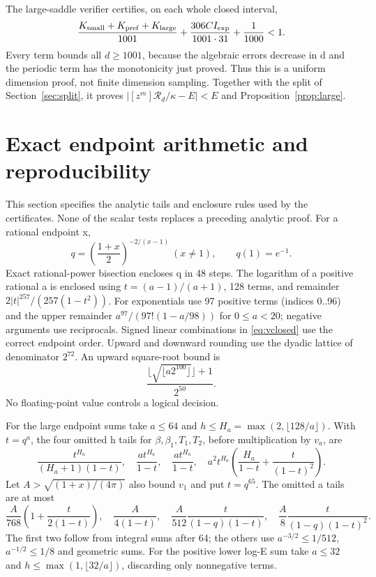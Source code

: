 \documentclass[11pt]{article}
\theoremstyle{remark}\newtheorem{remark}[theorem]{Remark}
\newcommand{\Rpoly}{\mathcal R}
\begin{document}
The large-saddle verifier certifies, on each whole closed interval,
\begin{equation}\label{eq:finalinterval}
 \frac{K_{\rm small}+K_{\rm pref}+K_{\rm large}}{1001}
       +\frac{306CI_{\exp}}{1001\cdot31}+\frac1{1000}<1.
\end{equation}
Every term bounds all $d\ge1001$, because the algebraic errors decrease in d
and the periodic term has the monotonicity just proved.
Thus this is a uniform dimension proof, not finite dimension sampling.
Together with the split of Section~\ref{sec:split}, it proves
$|[z^m]\Rpoly_d/\kappa-E|<E$ and Proposition~\ref{prop:large}.



\section{Exact endpoint arithmetic and reproducibility}\label{sec:exact}
This section specifies the analytic tails and enclosure rules used by the
certificates. None of the scalar tests replaces a preceding analytic proof.
For a rational endpoint x,
\[
 q=\left(\frac{1+x}{2}\right)^{-2/(x-1)}\ (x\ne1),\qquad q(1)=e^{-1}.
\]
Exact rational-power bisection encloses q in 48 steps.
The logarithm of a positive rational a is enclosed using
$t=(a-1)/(a+1)$, 128 terms, and remainder
$2|t|^{257}/(257(1-t^2))$.
For exponentials use 97 positive terms (indices 0..96) and the upper remainder
$a^{97}/(97!(1-a/98))$ for $0\le a<20$; negative arguments use reciprocals.
Signed linear combinations in \eqref{eq:vclosed} use the correct endpoint
order. Upward and downward rounding use the dyadic lattice of denominator
$2^{72}$. An upward square-root bound is
\[
 \frac{\lfloor\sqrt{\lfloor a2^{100}\rfloor}\rfloor+1}{2^{50}}.
\]
No floating-point value controls a logical decision.

For the large endpoint sums take $a\le64$ and
$h\le H_a=\max(2,\lfloor128/a\rfloor)$. With $t=q^a$, the four omitted
h tails for $\beta,\beta_1,T_1,T_2$, before multiplication by $v_a$, are
\[
 \frac{t^{H_a}}{(H_a+1)(1-t)},\quad
 \frac{a t^{H_a}}{1-t},\quad
 \frac{a t^{H_a}}{1-t},\quad
 a^2t^{H_a}\left(\frac{H_a}{1-t}+\frac{t}{(1-t)^2}\right).
\]
Let $A>\sqrt{(1+x)/(4\pi)}$ also bound $v_1$ and put $t=q^{65}$.
The omitted a tails are at most
\[
 \frac A{768}\left(1+\frac{t}{2(1-t)}\right),\quad
 \frac A{4(1-t)},\quad
 \frac A{512}\frac{t}{(1-q)(1-t)},\quad
 \frac A8\frac{t}{(1-q)(1-t)^2}.
\]
The first two follow from integral sums after 64; the others use
$a^{-3/2}\le1/512$, $a^{-1/2}\le1/8$ and geometric sums.
For the positive lower log-E sum take $a\le32$ and
$h\le\max(1,\lfloor32/a\rfloor)$, discarding only nonnegative terms.
\end{document}
